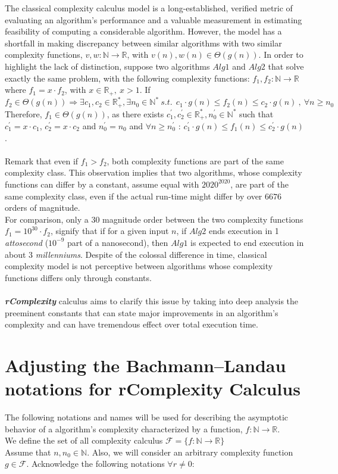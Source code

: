 The classical complexity calculus model is a long-established, verified metric of evaluating an algorithm's performance and a valuable measurement in estimating feasibility of computing a considerable algorithm. However, the model has a shortfall in making discrepancy between similar algorithms with two similar complexity functions, $v,w:\mathbb{N}\longrightarrow\mathbb{R}$, with $v(n),w(n) \in \Theta(g(n))$. In order to highlight the lack of distinction, suppose two algorithms $Alg1$ and $Alg2$ that solve exactly the same problem, with the following complexity functions:
$f_{1},f_{2}:\mathbb{N}\longrightarrow\mathbb{R}$ where $f_{1} = x \cdot f_{2}$, with $x \in \mathbb{R}_{+}, \ x > 1$.
If \[ f_{2} \in \Theta(g(n)) \Rightarrow \exists c_{1}, c_{2} \in \mathbb{R}^{*}_{+}, \exists n_{0} \in \mathbb{N}^{*}\ s.t.\ \ c_{1} \cdot g(n) \leq f_{2}(n) \leq c_{2} \cdot g(n)\ ,\  \forall n \geq n_{0} \]
Therefore, $f_{1} \in \Theta(g(n))$, as there exists $ c_{1}^{'}, c_{2}^{'} \in \mathbb{R}^{*}_{+},  n_{0}^{'} \in \mathbb{N}^{*}$ such that $ c_{1}^{'} =  x \cdot c_{1} $, $ c_{2}^{'} =  x \cdot c_{2} $ and $n_{0}^{'} = n_{0}$ and  $\forall n \geq n_{0}^{'} $ :  $c_{1}^{'} \cdot g(n) \leq f_{1}(n) \leq c_{2}^{'} \cdot g(n)$.
\\ \\ 
Remark that even if $f_{1} > f_{2}$, both complexity functions are part of the same complexity class. This observation implies that two algorithms, whose complexity functions can differ by a constant, assume equal with $2020^{2020}$, are part of the same complexity class, even if the actual run-time might differ by over $6676$ orders of magnitude. 
\\ For comparison, only a $30$ magnitude order between the two complexity functions $f_{1} = 10^{30} \cdot f_{2}$, signify
that if for a given input $n$, if $Alg2$ ends execution in 1 \textit{attosecond} ($10^{-9}$ part of a nanosecond), then $Alg1$ is expected to end execution in about 3 \textit{millenniums}. Despite of the colossal difference in time, classical complexity model is not perceptive between algorithms whose complexity functions differs only through constants. \\ \\ 
\textbf{\textit{rComplexity}} calculus aims to clarify this issue by taking into deep analysis the preeminent constants that can state major improvements in an algorithm's complexity and can have tremendous effect over total execution time. 


\section{Adjusting the Bachmann–Landau notations for rComplexity Calculus}
The following notations and names will be used for describing the asymptotic behavior of a algorithm's complexity characterized by a function, $f:\mathbb{N}\longrightarrow\mathbb{R}$. \\
We define the set of all complexity calculus $\mathcal{F}= \lbrace f:\mathbb{N}\longrightarrow\mathbb{R} \rbrace$
\\Assume that $n, n_{0}\in\mathbb{N}$. Also, we will consider an arbitrary complexity function $g \in \mathcal{F}$. 
Acknowledge the following notations $\forall r \neq 0$:

